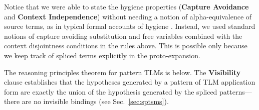 \documentclass[acmsmall]{acmart}
\begin{document}
Notice that we were able to state the hygiene properties (\textbf{Capture Avoidance} and \textbf{Context Independence}) without needing a notion of alpha-equivalence of source terms, as in typical formal accounts of hygiene \cite{Kohlbecker86a,DBLP:conf/popl/Adams15,DBLP:conf/popl/ClingerR91,DBLP:journals/lisp/DybvigHB92,DBLP:conf/esop/HermanW08,Herman10:Theory}. Instead, we used standard notions of capture avoiding substitution and free variables combined with the context disjointness conditions in the rules above. This is possible only because we keep track of spliced terms explicitly in the proto-expansion. %

The reasoning principles theorem for pattern TLMs is below. The \textbf{Visibility} clause establishes that the hypotheses generated by a pattern of TLM application form are exactly the union of the hypothesis generated by the spliced patterns---there are no invisible bindings (see Sec.~\ref{sec:sptsms}). %
\end{document}
